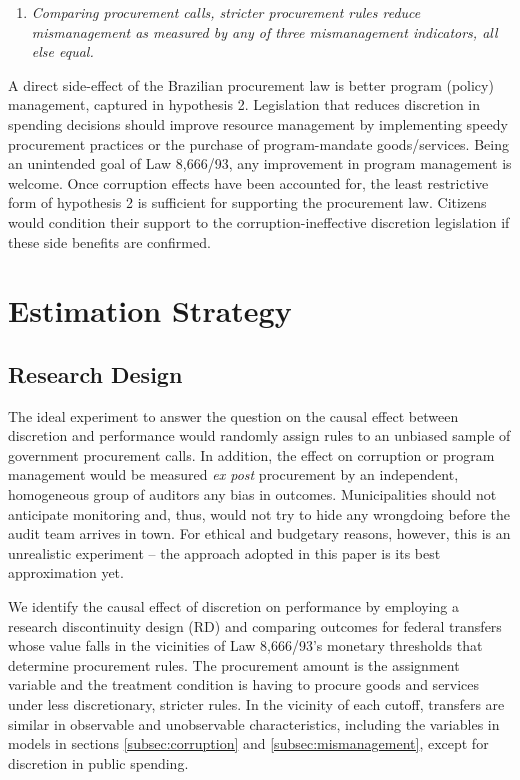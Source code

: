 \documentclass[11pt]{article}
\newcommand{\hypopen}{Comparing procurement calls}
\begin{document}
\begin{enumerate}[label = H\arabic{enumi}:, font = \bfseries, labelindent = \parindent, leftmargin = *, resume] %
  \item \textit{\hypopen, stricter procurement rules reduce mismanagement as measured by any of three mismanagement indicators, \emph{all else equal}.}
\end{enumerate}

A direct side-effect of the Brazilian procurement law is better program (policy) management, captured in hypothesis 2. Legislation that reduces discretion in spending decisions should improve resource management by implementing speedy procurement practices or the purchase of program-mandate goods/services. Being an unintended goal of Law 8,666/93, any improvement in program management is welcome. Once corruption effects have been accounted for, the least restrictive form of hypothesis 2 is sufficient for supporting the procurement law. Citizens would condition their support to the corruption-ineffective discretion legislation if these side benefits are confirmed.

\section{Estimation Strategy} \label{sec:methodology}

\subsection{Research Design} \label{subsec:methodology}

The ideal experiment to answer the question on the causal effect between discretion and performance would randomly assign rules to an unbiased sample of government procurement calls. In addition, the effect on corruption or program management would be measured \emph{ex post} procurement by an independent, homogeneous group of auditors any bias in outcomes. Municipalities should not anticipate monitoring and, thus, would not try to hide any wrongdoing before the audit team arrives in town. For ethical and budgetary reasons, however, this is an unrealistic experiment -- the approach  adopted in this paper is its best approximation yet.

We identify the causal effect of discretion on performance by employing a research discontinuity design (RD) and comparing outcomes for federal transfers whose value falls in the vicinities of Law 8,666/93's monetary thresholds that determine procurement rules. The procurement amount is the assignment variable and the treatment condition is having to procure goods and services under less discretionary, stricter rules. In the vicinity of each cutoff, transfers are similar in observable and unobservable characteristics, including the variables in models in sections \ref{subsec:corruption} and \ref{subsec:mismanagement}, except for discretion in public spending.
\end{document}

